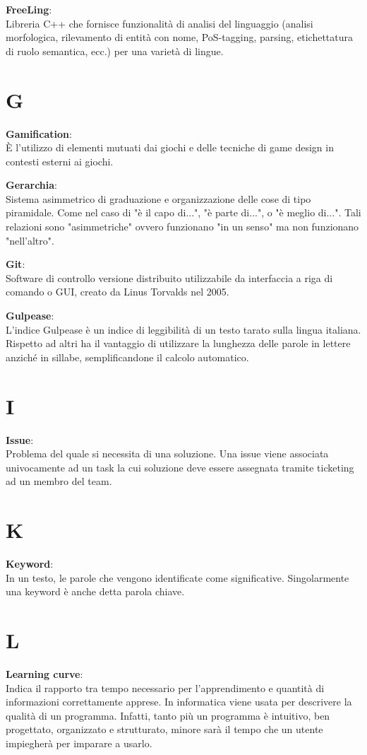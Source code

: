 \documentclass[a4paper, oneside, openany, dvipsnames, table]{article}
\begin{document}
\textbf{FreeLing}:\\ Libreria C++ che fornisce funzionalità di analisi del linguaggio (analisi morfologica, rilevamento di entità con nome, PoS-tagging, parsing, etichettatura di ruolo semantica, ecc.) per una varietà di lingue.

\newpage
\section{G}

\textbf{Gamification}: \\  È l'utilizzo di elementi mutuati dai giochi e delle tecniche di game design in contesti esterni ai giochi.

\textbf{Gerarchia}:\\ Sistema asimmetrico di graduazione e organizzazione delle cose di tipo piramidale.  
Come nel caso di "è il capo di...", "è parte di...", o "è meglio di...". Tali relazioni sono "asimmetriche" ovvero funzionano "in un senso" ma non funzionano "nell'altro".

\textbf{Git}:\\	 Software di controllo versione distribuito utilizzabile da interfaccia a riga di comando o GUI, creato da Linus Torvalds nel 2005.

\textbf{Gulpease}: \\  L'indice Gulpease è un indice di leggibilità di un testo tarato sulla lingua italiana. Rispetto ad altri ha il vantaggio di utilizzare la lunghezza delle parole in lettere anziché in sillabe, semplificandone il calcolo automatico.

\newpage
\section{I}
\textbf{Issue}:\\ Problema del quale si necessita di una soluzione. Una issue viene associata univocamente ad un task la cui soluzione deve essere assegnata tramite ticketing ad un membro del team.


\newpage
\section{K}
\textbf{Keyword}:\\	In un testo, le parole che vengono identificate come significative. Singolarmente una keyword è anche detta parola chiave.

\newpage
\section{L}
\textbf{Learning curve}:\\ Indica il rapporto tra tempo necessario per l'apprendimento e quantità di informazioni correttamente apprese. In informatica viene usata per descrivere la qualità di un programma. Infatti, tanto più un programma è intuitivo, ben progettato, organizzato e strutturato, minore sarà il tempo che un utente impiegherà per imparare a usarlo. 
\end{document}
